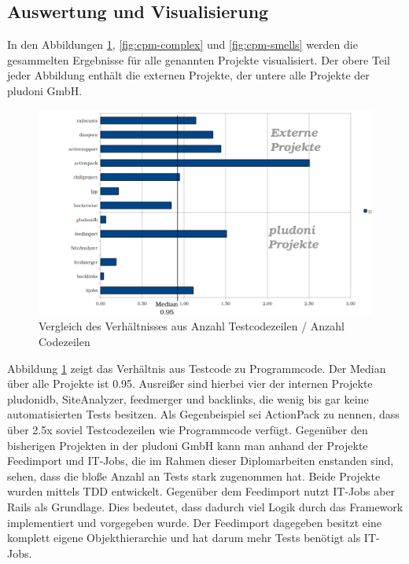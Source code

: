 \subsection{Auswertung und Visualisierung}
In den Abbildungen \ref{fig:cpm-loclot}, \ref{fig:cpm-complex} und \ref{fig:cpm-smells} werden die gesammelten Ergebnisse für alle genannten Projekte visualisiert. Der obere Teil jeder Abbildung enthält die externen Projekte, der untere alle Projekte der pludoni GmbH.
\begin{figure}[htbp]
 \centering
 \includegraphics[width=\linewidth]{./diagrams/cpm-lotloc.pdf}
 \caption{Vergleich des Verhältnisses aus Anzahl Testcodezeilen / Anzahl Codezeilen}
 \label{fig:cpm-loclot}
\end{figure}

Abbildung \ref{fig:cpm-loclot} zeigt das Verhältnis aus Testcode zu Programmcode. Der Median über alle Projekte ist 0.95. Ausreißer sind hierbei vier der internen Projekte pludonidb, SiteAnalyzer, feedmerger und backlinks, die wenig bis gar keine automatisierten  Tests besitzen. Als Gegenbeispiel sei ActionPack zu nennen, dass über 2.5x soviel Testcodezeilen wie Programmcode verfügt. Gegenüber den bisherigen Projekten in der pludoni GmbH kann man anhand der Projekte Feedimport und IT-Jobs, die im Rahmen dieser Diplomarbeiten enstanden sind, sehen, dass die bloße Anzahl an Tests stark zugenommen hat. Beide Projekte wurden mittels TDD entwickelt. Gegenüber dem Feedimport nutzt IT-Jobs aber Rails als Grundlage. Dies bedeutet, dass dadurch viel Logik durch das Framework implementiert und vorgegeben wurde. Der Feedimport dagegeben besitzt eine komplett eigene Objekthierarchie und hat darum mehr Tests benötigt als IT-Jobs.

